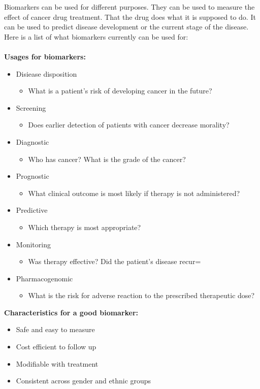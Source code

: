\documentclass[UKenglish,11pt,a4paper]{article}
\begin{document}
Biomarkers can be used for different purposes. They can be used to measure the effect of cancer drug treatment. That the
drug does what it is supposed to do. It can be used to predict disease development or the current stage of the
disease. Here is a list of what biomarkers currently can be used for:
\\\\
\textbf{Usages for biomarkers:} \cite{beyondpsa}
\begin{itemize}
    \item Disiease disposition
        \begin{itemize}
            \item What is a patient's risk of developing cancer in the future?
        \end{itemize}
    \item Screening
        \begin{itemize}
            \item Does earlier detection of patients with cancer decrease morality?
        \end{itemize}
    \item Diagnostic
        \begin{itemize}
            \item Who has cancer? What is the grade of the cancer?
        \end{itemize}
    \item Prognostic
        \begin{itemize}
            \item What clinical outcome is most likely if therapy is not administered?
        \end{itemize}
    \item Predictive
        \begin{itemize}
            \item Which therapy is most appropriate?
        \end{itemize}
    \item Monitoring
        \begin{itemize}
            \item Was therapy effective? Did the patient's disease recur=
        \end{itemize}
    \item Pharmacogenomic
        \begin{itemize}
            \item What is the risk for adverse reaction to the prescribed therapeutic dose?
        \end{itemize}
\end{itemize}
\textbf{Characteristics for a good biomarker:}
\begin{itemize}
    \item Safe and easy to measure
    \item Cost efficient to follow up
    \item Modifiable with treatment
    \item Consistent across gender and ethnic groups
\end{itemize}
\end{document}
